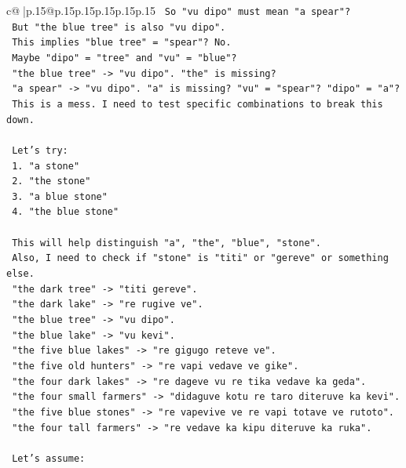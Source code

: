 \documentclass{article}
\begin{document}
{\begin{supertabular}{c@{$\;$}|p{.15\linewidth}@{}p{.15\linewidth}p{.15\linewidth}p{.15\linewidth}p{.15\linewidth}p{.15\linewidth}}
{{{\texttt{    So "vu dipo" must mean "a spear"?} \\
\texttt{    But "the blue tree" is also "vu dipo".} \\
\texttt{    This implies "blue tree" = "spear"? No.} \\
\texttt{    Maybe "dipo" = "tree" and "vu" = "blue"?} \\
\texttt{    "the blue tree" {-}> "vu dipo". "the" is missing?} \\
\texttt{    "a spear" {-}> "vu dipo". "a" is missing? "vu" = "spear"? "dipo" = "a"?} \\
\texttt{    This is a mess. I need to test specific combinations to break this down.} \\
\\ 
\texttt{    Let's try:} \\
\texttt{    1. "a stone"} \\
\texttt{    2. "the stone"} \\
\texttt{    3. "a blue stone"} \\
\texttt{    4. "the blue stone"} \\
\\ 
\texttt{    This will help distinguish "a", "the", "blue", "stone".} \\
\texttt{    Also, I need to check if "stone" is "titi" or "gereve" or something else.} \\
\texttt{    "the dark tree" {-}> "titi gereve".} \\
\texttt{    "the dark lake" {-}> "re rugive ve".} \\
\texttt{    "the blue tree" {-}> "vu dipo".} \\
\texttt{    "the blue lake" {-}> "vu kevi".} \\
\texttt{    "the five blue lakes" {-}> "re gigugo reteve ve".} \\
\texttt{    "the five old hunters" {-}> "re vapi vedave ve gike".} \\
\texttt{    "the four dark lakes" {-}> "re dageve vu re tika vedave ka geda".} \\
\texttt{    "the four small farmers" {-}> "didaguve kotu re taro diteruve ka kevi".} \\
\texttt{    "the five blue stones" {-}> "re vapevive ve re vapi totave ve rutoto".} \\
\texttt{    "the four tall farmers" {-}> "re vedave ka kipu diteruve ka ruka".} \\
\\ 
\texttt{    Let's assume:} \\
}}}
\end{supertabular}}
\end{document}
